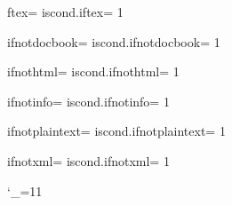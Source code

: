 {

%
\def\makecond#1{%
  \expandafter\let\csname #1\endcsname = \relax
  \expandafter\let\csname iscond.#1\endcsname = 1
}
\makecond{iftex}
\makecond{ifnotdocbook}
\makecond{ifnothtml}
\makecond{ifnotinfo}
\makecond{ifnotplaintext}
\makecond{ifnotxml}

%
\def\direntry{\doignore{direntry}}
\def\documentdescription{\doignore{documentdescription}}
\def\docbook{\doignore{docbook}}
\def\html{\doignore{html}}
\def\ifdocbook{\doignore{ifdocbook}}
\def\ifhtml{\doignore{ifhtml}}
\def\ifinfo{\doignore{ifinfo}}
\def\ifnottex{\doignore{ifnottex}}
\def\ifplaintext{\doignore{ifplaintext}}
\def\ifxml{\doignore{ifxml}}
\def\ignore{\doignore{ignore}}
\def\menu{\doignore{menu}}
\def\xml{\doignore{xml}}

%
\newcount\doignorecount

\def\doignore#1{\begingroup
  \obeylines
  \catcode`\@ = \other
  \catcode`\{ = \other
  \catcode`\} = \other
  \spaceisspace
  \doignorecount = 0
  \dodoignore{#1}%
}

{ \catcode`_=11 %
  \obeylines %
  \gdef\dodoignore#1{%
    \long\def\doignoretext##1^^M@end #1{%
      \doignoretextyyy##1^^M@#1\_STOP_}%
    \long\def\doignoretextyyy##1^^M@#1##2\_STOP_{\doignoreyyy{##2}\_STOP_}%
    \doignoretext ^^M%
  }%
}

\def\doignoreyyy#1{%
  \def\temp{#1}%
  \ifx\temp\empty			%
    \let\next\doignoretextzzz
  \else					%
    \advance\doignorecount by 1
    \let\next\doignoretextyyy		%
  \fi
  \next #1%
}

}
